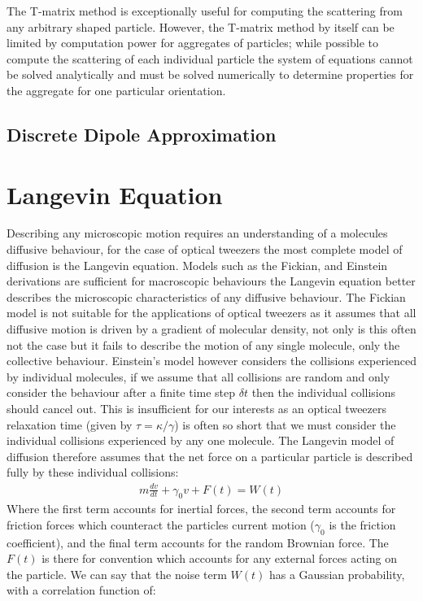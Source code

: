 \documentclass[a4paper,oneside,11pt]{book}
\begin{document}
The T-matrix method is exceptionally useful for computing the scattering from any arbitrary shaped particle. However, the T-matrix method by itself can be limited by computation power for aggregates of particles; while possible to compute the scattering of each individual particle the system of equations cannot be solved analytically and must be solved numerically to determine properties for the aggregate for one particular orientation. 

\subsection{Discrete Dipole Approximation}

\section{Langevin Equation}
Describing any microscopic motion requires an understanding of a molecules diffusive behaviour, for the case of optical tweezers the most complete model of diffusion is the Langevin equation. Models such as the Fickian, and Einstein derivations are sufficient for macroscopic behaviours the Langevin equation better describes the microscopic characteristics of any diffusive behaviour. The Fickian model is not suitable for the applications of optical tweezers as it assumes that all diffusive motion is driven by a gradient of molecular density, not only is this often not the case but it fails to describe the motion of any single molecule, only the collective behaviour. Einstein's model however considers the collisions experienced by individual molecules, if we assume that all collisions are random and only consider the behaviour after a finite time step $\delta t$ then the individual collisions should cancel out. This is insufficient for our interests as an optical tweezers relaxation time (given by $\tau = \kappa/\gamma$) is often so short that we must consider the individual collisions experienced by any one molecule. The Langevin model of diffusion therefore assumes that the net force on a particular particle is described fully by these individual collisions:
\begin{align}
	m\frac{dv}{dt} + \gamma_0 v + F(t) = W(t)
\end{align}
Where the first term accounts for inertial forces, the second term accounts for friction forces which counteract the particles current motion ($\gamma_0$ is the friction coefficient), and the final term accounts for the random Brownian force. The $F(t)$ is there for convention which accounts for any external forces acting on the particle. We can say that the noise term $W(t)$ has a Gaussian probability, with a correlation function of:
\end{document}
